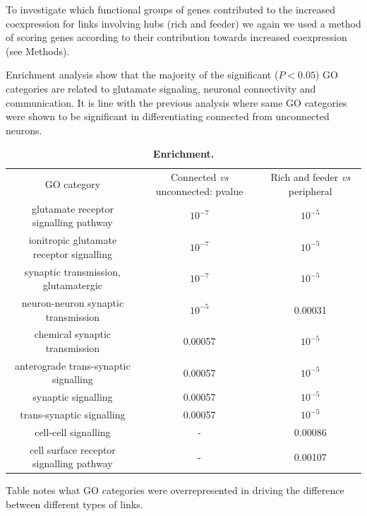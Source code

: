 \documentclass[10pt,letterpaper]{article}
\newlength\savedwidth
\newcommand\thickhline{\noalign{\global\savedwidth\arrayrulewidth\global\arrayrulewidth 2pt}%
\hline
\noalign{\global\arrayrulewidth\savedwidth}}
\begin{document}
To investigate which functional groups of genes contributed to the increased coexpression for links involving hubs (rich and feeder) we again we used a method of scoring genes according to their contribution towards increased coexpression (see Methods).

Enrichment analysis show that the majority of the significant ($P < 0.05$) GO categories are related to glutamate signaling, neuronal connectivity and communication.
It is line with the previous analysis where same GO categories were shown to be significant in differentiating connected from unconnected neurons.
\begin{table}[!ht]
\begin{adjustwidth}{-2.25in}{0in} %
\centering
\caption{
{\bf Enrichment.}}
\begin{tabular}{ |c|c|c| }
\thickhline

GO category  		& Connected \textit{vs} unconnected: pvalue  	& Rich and feeder \textit{vs} peripheral      \\ \thickhline
glutamate receptor signalling pathway      	& $10^{-7}$      		&  $10^{-5}$\\ \hline
ionitropic glutamate receptor signalling     & $10^{-7}$      		&  $10^{-5}$ \\ \hline
synaptic transmission, glutamatergic      	& $10^{-7}$     			&  $10^{-5}$ \\ \hline
neuron-neuron synaptic transmission          & $10^{-5}$     			&  0.00031\\ \hline
chemical synaptic transmission               & 0.00057      			&  $10^{-5}$\\ \hline
anterograde trans-synaptic signalling      	& 0.00057      			&  $10^{-5}$\\ \hline
synaptic signalling                          & 0.00057      			&  $10^{-5}$\\ \hline
trans-synaptic signalling                    & 0.00057      			&  $10^{-5}$ \\ \hline
cell-cell signalling                         &      -           		&  0.00086 \\ \hline
cell surface receptor signalling pathway     &       -          		&  0.00107 \\ \hline

\end{tabular}
\begin{flushleft} Table notes what GO categories were overrepresented in driving the difference between different types of links.
\end{flushleft}
\label{table1}
\end{adjustwidth}
\end{table}
\end{document}
